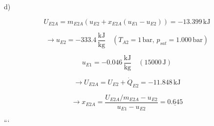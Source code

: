 d)

\[
U_{E2A} = m_{E2A} (u_{E2} + x_{E2A} (u_{E1} - u_{E2})) = -13.399 \, \text{kJ}
\]

\[
\rightarrow u_{E2} = -333.4 \, \frac{\text{kJ}}{\text{kg}} \quad \left( T_{A2} = 1 \, \text{bar}, \, p_{sat} = 1.000 \, \text{bar} \right)
\]

\[
u_{E1} = -0.046 \, \frac{\text{kJ}}{\text{kg}} \quad \left( 15000 \, \text{J} \right)
\]

\[
\rightarrow U_{E2A} = U_{E2} + \dot{Q}_{E2} = -11.848 \, \text{kJ}
\]

\[
\rightarrow x_{E2A} = \frac{U_{E2A}/m_{E2A} - u_{E2}}{u_{E1} - u_{E2}} = \underline{0.645}
\]

```